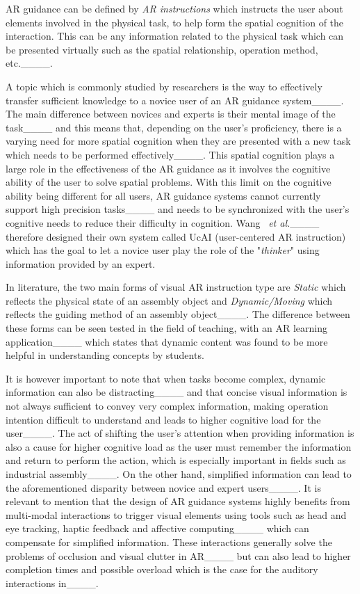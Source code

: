 AR guidance can be defined by \textit{AR instructions} which instructs the user about elements involved in the physical task, to help form the spatial cognition of the interaction. This can be any information related to the physical task which can be presented virtually such as the spatial relationship, operation method, etc.____.

A topic which is commonly studied by researchers is the way to effectively transfer sufficient knowledge to a novice user of an AR guidance system____. The main difference between novices and experts is their mental image of the task____ and this means that, depending on the user's proficiency, there is a varying need for more spatial cognition when they are presented with a new task which needs to be performed effectively____. This spatial cognition plays a large role in the effectiveness of the AR guidance as it involves the cognitive ability of the user to solve spatial problems.
With this limit on the cognitive ability being different for all users, AR guidance systems cannot currently support high precision tasks____ and needs to be synchronized with the user's cognitive needs to reduce their difficulty in cognition.
Wang ~\textit{et al.}____ therefore designed their own system called UcAI (user-centered AR instruction) which has the goal to let a novice user play the role of the "\textit{thinker}" using information provided by an expert.

In literature, the two main forms of visual AR instruction type are \textit{Static} which reflects the physical state of an assembly object and \textit{Dynamic/Moving} which reflects the guiding method of an assembly object____. 
The difference between these forms can be seen tested in the field of teaching, with an AR learning application____ which states that dynamic content was found to be more helpful in understanding concepts by students. 

It is however important to note that when tasks become complex, dynamic information can also be distracting____ and that concise visual information is not always sufficient to convey very complex information, making operation intention difficult to understand and leads to higher cognitive load for the user____.
The act of shifting the user's attention when providing information is also a cause for higher cognitive load as the user must remember the information and return to perform the action, which is especially important in fields such as industrial assembly____.
On the other hand, simplified information can lead to the aforementioned disparity between novice and expert users____.
It is relevant to mention that the design of AR guidance systems highly benefits from multi-modal interactions to trigger visual elements using tools such as head and eye tracking, haptic feedback and affective computing____ which can compensate for simplified information. These interactions generally solve the problems of occlusion and visual clutter in AR____ but can also lead to higher completion times and possible overload which is the case for the auditory interactions in____. 

